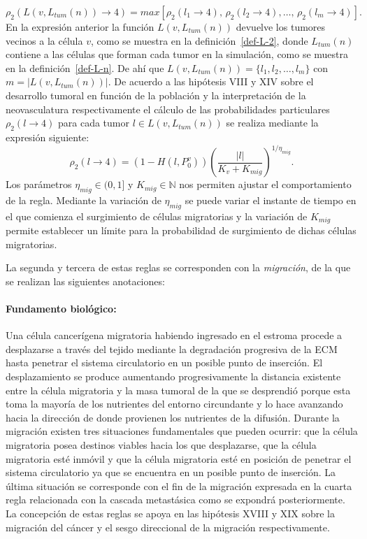 \begin{equation*}
\rho_2(L(v,L_{tum}(n)) \rightarrow 4) = max\left[\rho_2(l_1 \rightarrow 4),\,\rho_2(l_2 \rightarrow 4),\ldots,\,\rho_2(l_m \rightarrow 4)\right].
\end{equation*}
En la expresi\'on anterior la funci\'on $L(v,L_{tum}(n))$ devuelve los tumores vecinos a la c\'elula $v$, como se muestra en la definici\'on~\ref{def-L-2}, donde $L_{tum}(n)$ contiene a las c\'elulas que forman cada tumor en la simulaci\'on, como se muestra en la definici\'on~\ref{def-L-n}. De ah\'i que $L(v,L_{tum}(n))=\lbrace l_1, l_2, \ldots, l_m \rbrace$ con $m=|L(v,L_{tum}(n))|$. De acuerdo a las hip\'otesis VIII y XIV sobre el desarrollo tumoral en funci\'on de la poblaci\'on y la interpretaci\'on de la neovasculatura respectivamente el c\'alculo de las probabilidades particulares $\rho_2(l \rightarrow 4)$ para cada tumor $l \in L(v,L_{tum}(n))$ se realiza mediante la expresi\'on siguiente:
\begin{equation*}
\rho_2(l \rightarrow 4) = (1-H(l,P_0^v)) \left( \displaystyle\frac{|l|}{K_v + K_{mig}} \right)^{\displaystyle 1/\eta_{mig}}.
\end{equation*}
Los par\'ametros $\eta_{mig} \in (0,1]$ y $K_{mig} \in \mathbb{N}$ nos permiten ajustar el comportamiento de la regla. Mediante la variaci\'on de $\eta_{mig}$ se puede variar el instante de tiempo en el que comienza el surgimiento de c\'elulas migratorias y la variaci\'on de $K_{mig}$ permite establecer un l\'imite para la probabilidad de surgimiento de dichas c\'elulas migratorias.\vspace*{0.5cm}

La segunda y tercera de estas reglas se corresponden con la \emph{migraci\'on}, de la que se realizan las siguientes anotaciones:\label{NOT-migracion}

\paragraph*{{Fundamento biol\'ogico}:} Una c\'elula cancer\'igena migratoria habiendo ingresado en el estroma procede a desplazarse a trav\'es del tejido mediante la degradaci\'on progresiva de la ECM hasta penetrar el sistema circulatorio en un posible punto de inserci\'on. El desplazamiento se produce aumentando progresivamente la distancia existente entre la c\'elula migratoria y la masa tumoral de la que se desprendi\'o porque esta toma la mayor\'ia de los nutrientes del entorno circundante y lo hace avanzando hacia la direcci\'on de donde provienen los nutrientes de la difusi\'on. Durante la migraci\'on existen tres situaciones fundamentales que pueden ocurrir: que la c\'elula migratoria posea destinos viables hacia los que desplazarse, que la c\'elula migratoria est\'e inm\'ovil y que la c\'elula migratoria est\'e en posici\'on de penetrar el sistema circulatorio ya que se encuentra en un posible punto de inserci\'on. La \'ultima situaci\'on se corresponde con el fin de la migraci\'on expresada en la cuarta regla relacionada con la cascada metast\'asica como se expondr\'a posteriormente. La concepci\'on de estas reglas se apoya en las hip\'otesis XVIII y XIX sobre la migraci\'on del c\'ancer y el sesgo direccional de la migraci\'on respectivamente.


